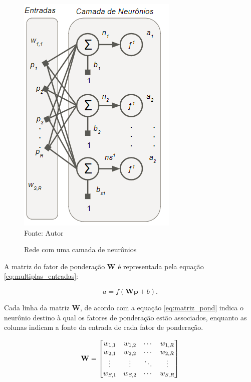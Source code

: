 \documentclass[
	12pt,				%
    oneside,			%
	a4paper,			%
	english,			%
	french,				%
	spanish,			%
	brazil,				%
	]{abntex2}
\begin{document}
\begin{figure}[H]
    \centering
    \caption{Rede com uma camada de neurônios}
    \includegraphics[scale=1]{Camada_neuronios1}\\
    Fonte: Autor\hfill
    \label{fig:Neuronio_uma_camada}
\end{figure}

A matriz do fator de ponderação \textbf{W} é representada pela equação \ref{eq:multiplas_entradas}:

 \begin{equation}
    \textit{a} = \textit{f}(\textbf{Wp} + \textit{b}).
    \label{eq:multiplas_entradas}
  \end{equation} 
  

Cada linha da matriz \textbf{W}, de acordo com a equação \ref{eq:matriz_pond} indica o neurônio destino à qual os fatores de ponderação estão associados, enquanto as colunas indicam a fonte da entrada de cada fator de ponderação.

\begin{equation}
\centering
\textbf{W} ={\begin{bmatrix}
    w_{1,1} & w_{1,2} & \cdots & w_{1,R}\\
    w_{2,1} & w_{2,2} & \cdots & w_{2,R}\\
    \vdots & \vdots & \ddots & \vdots \\
    w_{S,1} & w_{S,2} & \cdots & w_{S,R}
\end{bmatrix}}
\label{eq:matriz_pond}
\end{equation} 
\end{document}
